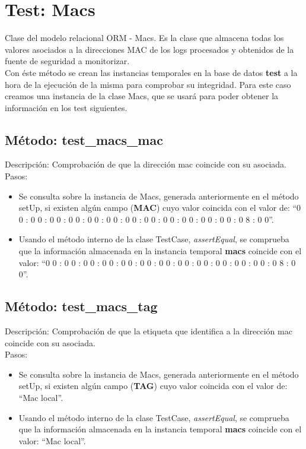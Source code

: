 

\section{\quad Test: Macs}

Clase del modelo relacional ORM - Macs. Es la clase que almacena todas los valores asociados a la direcciones MAC de los logs procesados y obtenidos de la fuente de seguridad a monitorizar.\\

Con éste método se crean las instancias temporales en la base de datos \textbf{test} a la hora de la ejecución de la misma para comprobar su integridad. Para este caso creamos una instancia de la clase Macs, que se usará para poder obtener la información en los test siguientes.\\



\subsection{\quad Método: test\_macs\_mac}

Descripción: Comprobación de que la dirección mac coincide con su asociada.\\
Pasos:
\begin{itemize}
\item Se consulta sobre la instancia de Macs, generada anteriormente en el método setUp, si existen algún campo (\textbf{MAC}) cuyo valor coincida con el valor de: ``0 0 : 0 0 : 0 0 : 0 0 : 0 0 : 0 0 : 0 0 : 0 0 : 0 0 : 0 0 : 0 0 : 0 0 : 0 8 : 0 0''.
\item Usando el método interno de la clase TestCase, \emph{assertEqual}, se comprueba que la información almacenada en la instancia temporal \textbf{macs} coincide con el valor: ``0 0 : 0 0 : 0 0 : 0 0 : 0 0 : 0 0 : 0 0 : 0 0 : 0 0 : 0 0 : 0 0 : 0 0 : 0 8 : 0 0''.
\end{itemize}



\subsection{\quad Método: test\_macs\_tag}

Descripción: Comprobación de que la etiqueta que identifica a la dirección mac coincide con su asociada.\\
Pasos:
\begin{itemize}
\item Se consulta sobre la instancia de Macs, generada anteriormente en el método setUp, si existen algún campo (\textbf{TAG}) cuyo valor coincida con el valor de: ``Mac local''.
\item Usando el método interno de la clase TestCase, \emph{assertEqual}, se comprueba que la información almacenada en la instancia temporal \textbf{macs} coincide con el valor: ``Mac local''.
\end{itemize}

